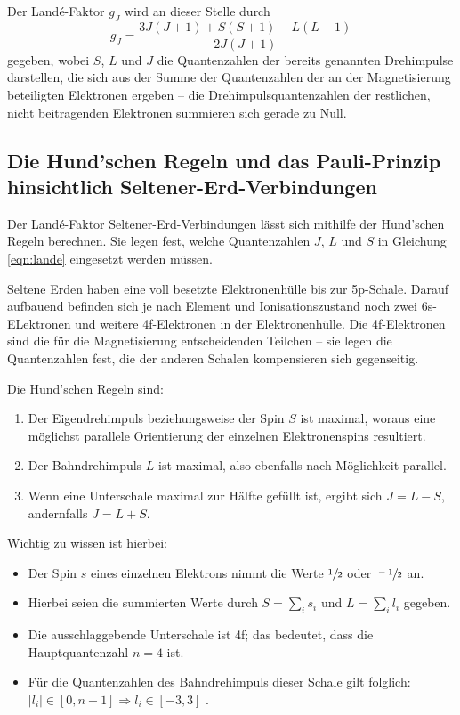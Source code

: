     Der Landé-Faktor $g_J$ wird an dieser Stelle durch 
    \begin{equation}
        g_J=\frac{3J(J+1)+S(S+1)-L(L+1)}{2J(J+1)}
        \label{eqn:lande}
    \end{equation}
    gegeben, wobei $S$, $L$ und $J$ die Quantenzahlen der bereits genannten Drehimpulse darstellen, die sich aus der Summe
    der Quantenzahlen der an der Magnetisierung beteiligten Elektronen ergeben -- die Drehimpulsquantenzahlen der restlichen, nicht beitragenden
    Elektronen summieren sich gerade zu Null. 

\subsection{Die Hund'schen Regeln und das Pauli-Prinzip hinsichtlich Seltener-Erd-Verbindungen}
\label{sub:wauwau}

    Der Landé-Faktor Seltener-Erd-Verbindungen lässt sich mithilfe der Hund'schen Regeln berechnen. 
    Sie legen fest, welche Quantenzahlen $J$, $L$ und $S$ in Gleichung \eqref{eqn:lande} eingesetzt werden müssen. 

    Seltene Erden haben eine voll besetzte Elektronenhülle bis zur 5p-Schale. Darauf aufbauend befinden sich je nach 
    Element und Ionisationszustand noch zwei 6s-ELektronen und weitere 4f-Elektronen in der Elektronenhülle. 
    Die 4f-Elektronen sind die für die Magnetisierung entscheidenden Teilchen -- sie legen die Quantenzahlen fest, 
    die der anderen Schalen kompensieren sich gegenseitig. 

    Die Hund'schen Regeln sind\cite{Versuchsanleitung}:
    \begin{enumerate}
        \item Der Eigendrehimpuls beziehungsweise der Spin $S$ ist maximal, woraus eine möglichst parallele Orientierung 
            der einzelnen Elektronenspins resultiert.    
        \item Der Bahndrehimpuls $L$ ist maximal, also ebenfalls nach Möglichkeit parallel. 
        \item Wenn eine Unterschale maximal zur Hälfte gefüllt ist, ergibt sich ${J=L-S}$, andernfalls ${J=L+S}$.
    \end{enumerate}
    Wichtig zu wissen ist hierbei: 
    \begin{itemize}
        \item Der Spin $s$ eines einzelnen Elektrons nimmt die Werte $\sfrac{1}{2}$ oder $\sfrac{-1}{2}$ an. 
        \item Hierbei seien die summierten Werte durch $S=\sum_i s_i$ und $L=\sum_i l_i$ gegeben. 
        \item Die ausschlaggebende Unterschale ist 4f; das bedeutet, dass die Hauptquantenzahl ${n=4}$ ist.
        \item Für die Quantenzahlen des Bahndrehimpuls dieser Schale gilt folglich: $|l_i| \in [0,n-1] \Rightarrow l_i \in [-3,3]$ .
    \end{itemize}

